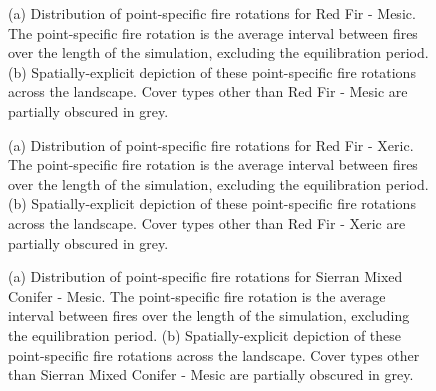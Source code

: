 \begin{figure}[!htbp]
  \centering
  \caption{(a) Distribution of point-specific fire rotations for Red Fir - Mesic. The point-specific fire rotation is the average interval between fires over the length of the simulation, excluding the equilibration period. (b) Spatially-explicit depiction of these point-specific fire rotations across the landscape. Cover types other than Red Fir - Mesic are partially obscured in grey.}
\label{fig:preturn_rfrm}
\end{figure}

\begin{figure}[!htbp]
  \centering
  \caption{(a) Distribution of point-specific fire rotations for Red Fir - Xeric. The point-specific fire rotation is the average interval between fires over the length of the simulation, excluding the equilibration period. (b) Spatially-explicit depiction of these point-specific fire rotations across the landscape. Cover types other than Red Fir - Xeric are partially obscured in grey.}
\label{fig:preturn_rfrx}
\end{figure}

\begin{figure}[!htbp]
  \centering
  \caption{(a) Distribution of point-specific fire rotations for Sierran Mixed Conifer - Mesic. The point-specific fire rotation is the average interval between fires over the length of the simulation, excluding the equilibration period. (b) Spatially-explicit depiction of these point-specific fire rotations across the landscape. Cover types other than Sierran Mixed Conifer - Mesic are partially obscured in grey.}
\label{fig:preturn_smcm_app}
\end{figure}

